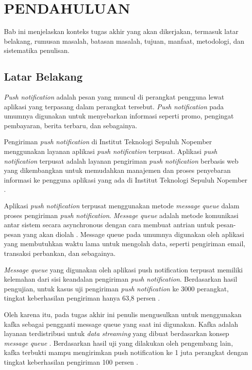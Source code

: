 \vspace{0ex}
\chapter {PENDAHULUAN}
\par Bab ini menjelaskan konteks tugas akhir yang akan dikerjakan, termasuk latar belakang, rumusan masalah, batasan masalah, tujuan, manfaat, metodologi, dan sistematika penulisan.

\section{Latar Belakang}
\par \textit{Push notification} adalah pesan yang muncul di perangkat pengguna lewat aplikasi yang terpasang dalam perangkat tersebut. \textit{Push notification} pada umumnya digunakan untuk menyebarkan informasi seperti promo, pengingat pembayaran, berita terbaru, dan sebagainya.
\par Pengiriman \textit{push notification} di Institut Teknologi Sepuluh Nopember menggunakan layanan aplikasi \textit{push notification} terpusat. Aplikasi \textit{push notification} terpusat adalah layanan pengiriman \textit{push notification} berbasis web yang dikembangkan untuk memudahkan manajemen dan proses penyebaran informasi ke pengguna aplikasi yang ada di Institut Teknologi Sepuluh Nopember \cite{application-thesis}.
\par Aplikasi \textit{push notification} terpusat menggunakan metode \textit{message queue} dalam proses pengiriman \textit{push notification}. \textit{Message queue} adalah metode komunikasi antar sistem secara asynchronous dengan cara membuat antrian untuk pesan-pesan yang akan diolah \cite{message-queue-online}. Message queue pada umumnya digunakan oleh aplikasi yang membutuhkan waktu lama untuk mengolah data, seperti pengiriman email, transaksi perbankan, dan sebagainya.
\par \textit{Message queue} yang digunakan oleh aplikasi push notification terpusat memiliki kelemahan dari sisi keandalan pengiriman \textit{push notification}. Berdasarkan hasil pengujian, untuk kasus uji pengiriman \textit{push notification} ke 3000 perangkat, tingkat keberhasilan pengiriman hanya 63,8 persen \cite{application-thesis}.
\par Oleh karena itu, pada tugas akhir ini penulis mengusulkan untuk menggunakan kafka sebagai pengganti message queue yang saat ini digunakan. Kafka adalah layanan terdistribusi untuk \textit{data streaming} yang dibuat berdasarkan konsep \textit{message queue} \cite{kafka-online}. Berdasarkan hasil uji yang dilakukan oleh pengembang lain, kafka terbukti mampu mengirimkan push notification ke 1 juta perangkat dengan tingkat keberhasilan pengiriman 100 persen \cite{prototype-article}.

